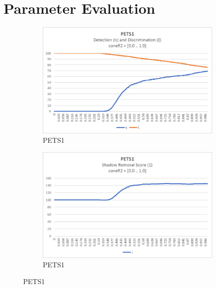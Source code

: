 \begin{appendices}
\begin{table}
\begin{tabular}{ |c|c|c|c|c|c|c|c|c|c|c| }
\hline
\end{tabular}

\end{table}

\chapter{Parameter Evaluation}
\clearpage
\FloatBarrier
\begin{figure}

  \begin{subfigure}{.45\linewidth}
  \includegraphics[width=1\linewidth]{figures/appendix/pets1_coneR2_response.jpg}
  \caption{PETS1}
\end{subfigure}
\hfill
\begin{subfigure}{.45\linewidth}
  \includegraphics[width=1\linewidth]{figures/appendix/pets1_coneR2_score.jpg}
  \caption{PETS1}
\end{subfigure}

\end{figure}
\end{appendices}
